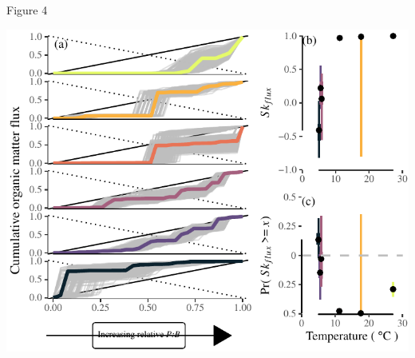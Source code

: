 \documentclass[
]{article}
\numberwithin{equation}
\begin{document}
\newpage

Figure 4

\includegraphics{Junker_temp-energy-flux_accepted_files/figure-latex/figure 4-1.pdf}
\end{document}
